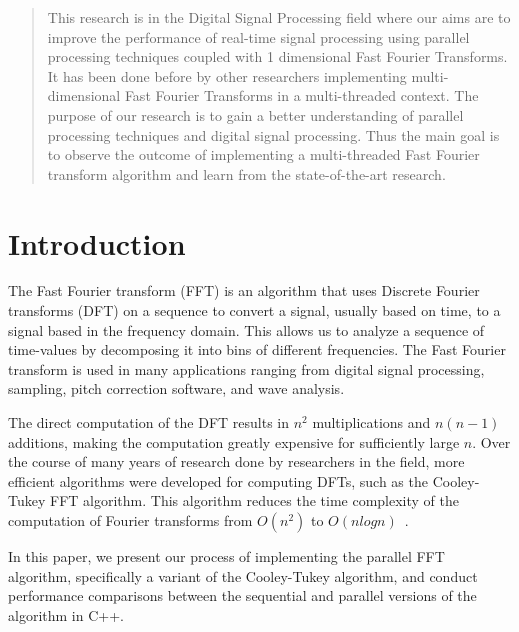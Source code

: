 \documentclass[journal]{IEEEtran}
\begin{document}
\maketitle

\begin{abstract}
This research is in the Digital Signal Processing field 
where our aims are to improve the performance of real-time signal 
processing using parallel processing techniques coupled with 1 
dimensional Fast Fourier Transforms. 
It has been done before by other researchers implementing 
multi-dimensional Fast Fourier Transforms in a multi-threaded context. 
The purpose of our research is to gain a better understanding of 
parallel processing techniques and digital signal processing. 
Thus the main goal is to observe the outcome of implementing a 
multi-threaded Fast Fourier transform algorithm and learn from the 
state-of-the-art research.
\end{abstract}

\section{Introduction}
	\par {The Fast Fourier transform (FFT) is an algorithm that uses Discrete Fourier transforms
	 (DFT) on a sequence to convert a signal, usually based on time, to a signal based in the
	 frequency domain. This allows us to analyze a sequence of time-values by decomposing it into
	 bins of different frequencies. The Fast Fourier transform is used in many applications ranging
	 from digital signal processing, sampling, pitch correction software, and wave analysis.}

	\par {The direct computation of the DFT results in $n^2$ multiplications and $n(n-1)$ additions,
	making the computation greatly expensive for sufficiently large $n$.  Over the course of many years
	of research done by researchers in the field, more efficient algorithms were developed for computing DFTs,
	such as the Cooley-Tukey FFT algorithm. This algorithm reduces the time complexity of the computation of
	Fourier transforms from $O(n^2)$ to $O(nlogn)$~\cite{Xiang}}.

	\par {In this paper, we present our process of implementing the parallel FFT algorithm, specifically
	a variant of the Cooley-Tukey algorithm, and conduct performance comparisons between the sequential and 
	parallel versions of the algorithm in C++.}
\end{document}
